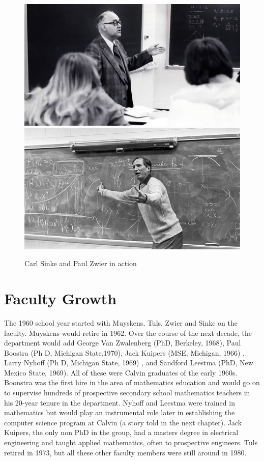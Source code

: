 \documentclass[
]{book}
\begin{document}
\begin{figure}

{\centering \includegraphics[width=0.5\linewidth]{images/sinke1} \includegraphics[width=0.5\linewidth]{images/zwier} 

}

\caption{Carl Sinke and Paul Zwier in action}\label{fig:sinkzwier}
\end{figure}

\hypertarget{faculty-growth}{%
\section{Faculty Growth}\label{faculty-growth}}

The 1960 school year started with Muyskens, Tuls, Zwier and Sinke on the faculty. Muyskens would retire in 1962.
Over the course of the next decade, the department would add George Van Zwalenberg (PhD, Berkeley, 1968), Paul Boostra (Ph D, Michigan State,1970), Jack Kuipers (MSE, Michigan, 1966) , Larry Nyhoff (Ph D, Michigan State, 1969) , and Sandford Leestma (PhD, New Mexico State, 1969). All of these were Calvin graduates of the early 1960s. Boonstra was the first hire in the area of mathematics education and would go on to supervise hundreds of prospective secondary school mathematics teachers in his 20-year tenure in the department. Nyhoff and Leestma were trained in mathematics but would play an instrumental role later in establishing the computer science program at Calvin (a story told in the next chapter). Jack Kuipers, the only non PhD in the group, had a masters degree in electrical engineering and taught applied mathematics, often to prospective engineers. Tuls retired in 1973, but all these other faculty members were still around in 1980.
\end{document}
